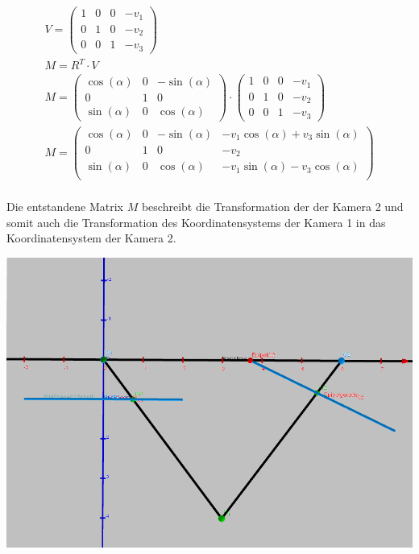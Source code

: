 \begin{gather}
V= 
\begin{pmatrix}
1&0&0&-v_1\\
0&1&0&-v_2\\
0&0&1&-v_3			
\end{pmatrix}\\
M=R^T\cdot V\\
M=		\begin{pmatrix}
\cos(\alpha)&0&-\sin(\alpha)\\
0&1&0\\
\sin(\alpha)&0&\cos(\alpha)
\end{pmatrix} 
\cdot
\begin{pmatrix}
1&0&0&-v_1\\
0&1&0&-v_2\\
0&0&1&-v_3			
\end{pmatrix}\\
M=
\begin{pmatrix}
\cos(\alpha)&0&-\sin(\alpha)&-v_1\cos(\alpha)+v_3\sin(\alpha)\\
0&1&0&-v_2\\
\sin(\alpha)&0&\cos(\alpha)&-v_1\sin(\alpha)-v_3\cos(\alpha)\\
\end{pmatrix}
\end{gather}\\

Die entstandene Matrix \ensuremath{M} beschreibt die Transformation der der Kamera 2 und somit auch die Transformation des Koordinatensystems der Kamera 1 in das Koordinatensystem der Kamera 2.

\begin{minipage}{\linewidth}
	\centering
	\includegraphics[width=1.\linewidth]{images/TopDownSystem.png}
\end{minipage}\\ \\

